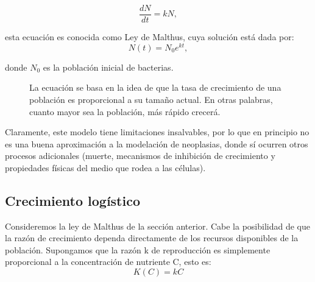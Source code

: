 \begin{equation}
    \frac{dN}{dt} = kN,
\end{equation}

esta ecuaci\'on es conocida como Ley de Malthus, cuya soluci\'on est\'a dada por:
\begin{equation}
    N(t) = N_{0}e^{kt},
\end{equation}

donde $N_{0}$ es la poblaci\'on inicial de bacterias.

\begin{figure}[!ht]
\begin{center}
\end{center}\vspace*{-0.6cm}
\caption[Ley de Malthus]{La ecuación se basa en la idea de que la tasa de crecimiento de una población es proporcional a su tamaño actual. En otras palabras, cuanto mayor sea la población, más rápido crecerá.}
\label{fig-malthus}
\end{figure}

Claramente, este modelo tiene limitaciones insalvables, por lo que en principio no es una buena aproximación a la modelación de neoplasias, donde sí ocurren otros procesos adicionales (muerte, mecanismos de inhibición de crecimiento y propiedades físicas del medio que rodea a las células).

\subsection{Crecimiento logístico}
Consideremos la ley de Malthus de la sección anterior. Cabe la posibilidad de que la razón de crecimiento dependa directamente de los recursos disponibles de la población. Supongamos que la razón k de reproducción es simplemente proporcional a la concentración de nutriente C, esto es:
\begin{equation}
    K(C) = kC
\end{equation}

